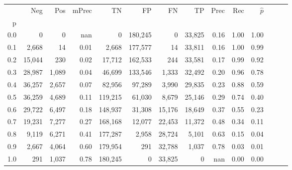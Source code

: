 \begin{tabular}{rrrrrrrrrrrrrr}
\toprule
{} &     Neg &    Pos & mPrec &       TN &       FP &      FN &      TP &  Prec &   Rec & $\hat{p}$ \\
p   &         &        &       &          &          &         &         &       &       &           \\
\midrule
0.0 &       0 &      0 &   nan &        0 &  180,245 &       0 &  33,825 &  0.16 &  1.00 &      1.00 \\
0.1 &   2,668 &     14 &  0.01 &    2,668 &  177,577 &      14 &  33,811 &  0.16 &  1.00 &      0.99 \\
0.2 &  15,044 &    230 &  0.02 &   17,712 &  162,533 &     244 &  33,581 &  0.17 &  0.99 &      0.92 \\
0.3 &  28,987 &  1,089 &  0.04 &   46,699 &  133,546 &   1,333 &  32,492 &  0.20 &  0.96 &      0.78 \\
0.4 &  36,257 &  2,657 &  0.07 &   82,956 &   97,289 &   3,990 &  29,835 &  0.23 &  0.88 &      0.59 \\
0.5 &  36,259 &  4,689 &  0.11 &  119,215 &   61,030 &   8,679 &  25,146 &  0.29 &  0.74 &      0.40 \\
0.6 &  29,722 &  6,497 &  0.18 &  148,937 &   31,308 &  15,176 &  18,649 &  0.37 &  0.55 &      0.23 \\
0.7 &  19,231 &  7,277 &  0.27 &  168,168 &   12,077 &  22,453 &  11,372 &  0.48 &  0.34 &      0.11 \\
0.8 &   9,119 &  6,271 &  0.41 &  177,287 &    2,958 &  28,724 &   5,101 &  0.63 &  0.15 &      0.04 \\
0.9 &   2,667 &  4,064 &  0.60 &  179,954 &      291 &  32,788 &   1,037 &  0.78 &  0.03 &      0.01 \\
1.0 &     291 &  1,037 &  0.78 &  180,245 &        0 &  33,825 &       0 &   nan &  0.00 &      0.00 \\
\bottomrule
\end{tabular}
